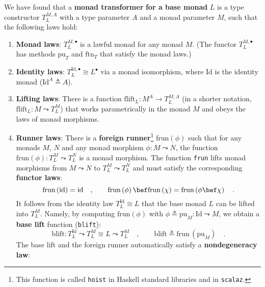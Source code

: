 We have found that a \textbf{monad transformer}
\textbf{for a base monad} $L$ is a type constructor $T_{L}^{M,A}$
with a type parameter $A$ and a monad parameter $M$, such that the
following laws hold:
\begin{enumerate}
\item \textbf{Monad laws}: $T_{L}^{M,\bullet}$ is a lawful monad for any
monad $M$. (The functor $T_{L}^{M,\bullet}$
has methods $\text{pu}_{T}$ and $\text{ftn}_{T}$ that satisfy the
monad laws.)
\item \textbf{Identity laws}: $T_{L}^{\text{Id},\bullet}\cong L^{\bullet}$
via a monad isomorphism, where $\text{Id}$ is the identity monad
($\text{Id}^{A}\triangleq A$).
\item \textbf{Lifting laws}: There
is a function $\text{flift}_{L}:M^{A}\rightarrow T_{L}^{M,A}$ (in
a shorter notation, $\text{flift}_{L}:M\leadsto T_{L}^{M}$) that
works parametrically in the monad $M$ and obeys the laws of monad
morphisms.
\item \textbf{Runner laws}: There
is a \textbf{foreign runner}\footnote{This function is called \lstinline!hoist! in Haskell standard libraries
and in \texttt{scalaz}.} $\text{frun}\left(\phi\right)$ such that for any monads $M$, $N$
and any monad morphism $\phi:M\leadsto N$, the function $\text{frun}\left(\phi\right):T_{L}^{M}\leadsto T_{L}^{N}$
is a monad morphism. The function \lstinline!frun! lifts monad morphisms
from $M\leadsto N$ to $T_{L}^{M}\leadsto T_{L}^{N}$ and must satisfy
the corresponding \textbf{functor laws}:
\[
\text{frun}\left(\text{id}\right)=\text{id}\quad,\quad\quad\text{frun}\left(\phi\right)\bef\text{frun}\left(\chi\right)=\text{frun}\left(\phi\bef\chi\right)\quad.
\]
It follows from the identity law $T_{L}^{\text{Id}}\cong L$ that
the base monad $L$ can be lifted into $T_{L}^{M}$. Namely, by computing
$\text{frun}\left(\phi\right)$ with $\phi\triangleq\text{pu}_{M}:\text{Id}\leadsto M$,
we obtain a \textbf{base lift}
function (\lstinline!blift!):
\[
\text{blift}:T_{L}^{\text{Id}}\leadsto T_{L}^{M}\cong L\leadsto T_{L}^{M}\quad,\quad\quad\text{blift}\triangleq\text{frun}\,(\text{pu}_{M})\quad.
\]
The base lift and the foreign runner automatically satisfy a \textbf{nondegeneracy
law}:

\end{enumerate}
